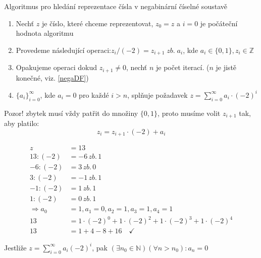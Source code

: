 \documentclass[czech,bachelor,dept470,male]{diploma}
\newcommand{\posla}{\{a_i\}_{i=0}^{\infty}}
\begin{document}
\begin{remark} Algoritmus pro hledání reprezentace čísla v negabinární číselné soustavě\newline
	\begin{enumerate}
		\item Nechť $z$ je číslo, které chceme reprezentovat, $z_0 = z$ a $i=0$ je počáteční hodnota algoritmu
		\item Provedeme následující operaci:\newline $z_i/(-2)=z_{i+1}\;zb.\;a_i$, kde $ a_i\in\{0,1\}, 
		z_i\in\mathbb{Z}$
		\item Opakujeme operaci dokud $z_{i+1}\ne0$, nechť $n$ je počet iterací. ($n$ je jistě konečné, viz. \ref{negaDF})
		\item $\posla$, kde $a_i=0$ pro každé $i>n$, splňuje požadavek $z=
		\sum_{i=0}^{\infty}a_i\cdot(-2)^i$
	\end{enumerate}
	Pozor! zbytek musí vždy patřit do množiny $\{0,1\}$, proto musíme volit $z_{i+1}$ tak, aby platilo: $$z_i=z_{i+1}\cdot(-2)+a_i$$
\end{remark}
\begin{example}
	\begin{align}
	z&=13\nonumber\\
	13:(-2)&=-6\,zb.\,1\nonumber\\
	-6:(-2)&=3\,zb.\,0\nonumber\\
	3:(-2)&=-1\,zb.\,1\nonumber\\
	-1:(-2)&=1\,zb.\,1\nonumber\\
	1:(-2)&=0\,zb.\,1\nonumber\\
	\Rightarrow a_0&=1, a_1=0,a_2=1,a_3=1,a_4=1\nonumber\\
	13 &= 1\cdot(-2)^0 + 1 \cdot(-2)^2+1\cdot(-2)^3+1\cdot(-2)^4\nonumber\\
	13 &= 1 + 4-8+16\quad \checkmark\nonumber
	\end{align}
\end{example}
\begin{theorem}
	Jestliže $z=\sum_{i=0}^{\infty}a_i(-2)^i$, pak $(\exists n_0 \in \mathbb{N})(\forall n>n_0):a_n=0$
\end{theorem}
\end{document}
